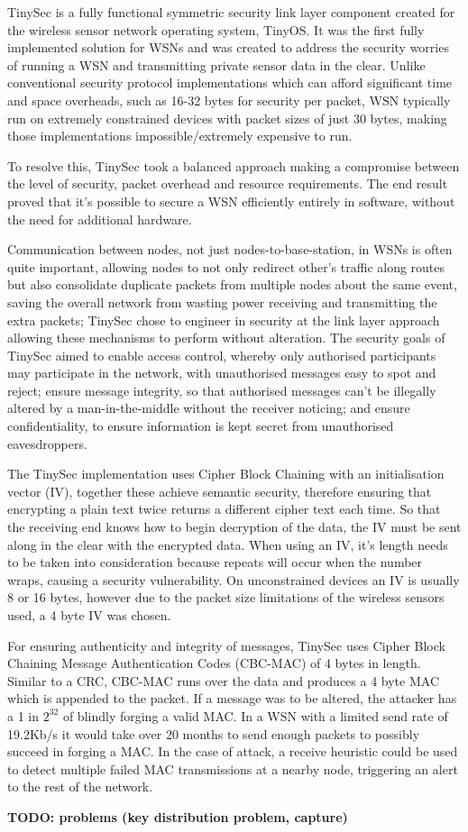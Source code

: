 TinySec is a fully functional symmetric security link layer component created for the wireless sensor network operating system, TinyOS. It was the first fully implemented solution for WSNs and was created to address the security worries of running a WSN and transmitting private sensor data in the clear. Unlike conventional security protocol implementations which can afford significant time and space overheads, such as 16-32 bytes for security per packet, WSN typically run on extremely constrained devices with packet sizes of just 30 bytes, making those implementations impossible/extremely expensive to run.

To resolve this, TinySec took a balanced approach making a compromise between the level of security, packet overhead and resource requirements. The end result proved that it's possible to secure a WSN efficiently entirely in software, without the need for additional hardware. 

Communication between nodes, not just nodes-to-base-station, in WSNs is often quite important, allowing nodes to not only redirect other's traffic along routes but also consolidate duplicate packets from multiple nodes about the same event, saving the overall network from wasting power receiving and transmitting the extra packets; TinySec chose to engineer in security at the link layer approach allowing these mechanisms to perform without alteration. The security goals of TinySec aimed to enable access control, whereby only authorised participants may participate in the network, with unauthorised messages easy to spot and reject; ensure message integrity, so that authorised messages can't be illegally altered by a man-in-the-middle without the receiver noticing; and ensure confidentiality, to ensure information is kept secret from unauthorised eavesdroppers. 

The TinySec implementation uses Cipher Block Chaining with an initialisation vector (IV), together these achieve semantic security, therefore ensuring that encrypting a plain text twice returns a different cipher text each time. So that the receiving end knows how to begin decryption of the data, the IV must be sent along in the clear with the encrypted data. When using an IV, it's length needs to be taken into consideration because repeats will occur when the number wraps, causing a security vulnerability. On unconstrained devices an IV is usually 8 or 16 bytes, however due to the packet size limitations of the wireless sensors used, a 4 byte IV was chosen.

For ensuring authenticity and integrity of messages, TinySec uses Cipher Block Chaining Message Authentication Codes (CBC-MAC) of 4 bytes in length. Similar to a CRC, CBC-MAC runs over the data and produces a 4 byte MAC which is appended to the packet. If a message was to be altered, the attacker has a 1 in $2^{32}$ of blindly forging a valid MAC. In a WSN with a limited send rate of 19.2Kb/s it would take over 20 months to send enough packets to possibly succeed in forging a MAC. In the case of attack, a receive heuristic could be used to detect multiple failed MAC transmissions at a nearby node, triggering an alert to the rest of the network.

\textbf{TODO: problems (key distribution problem, capture)}
